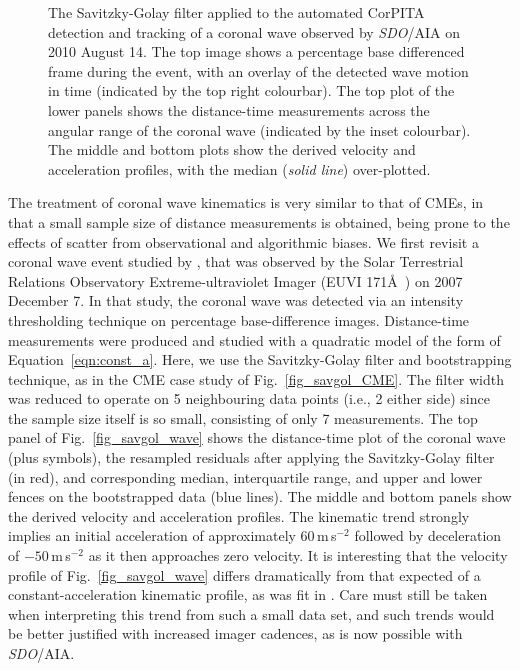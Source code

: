 \documentclass[structabstract]{aa}
\begin{document}
\begin{figure}[!t]
\caption{The Savitzky-Golay filter applied to the automated CorPITA detection and tracking of a coronal wave observed by \emph{SDO}/AIA on 2010 August 14. The top image shows a percentage base differenced frame during the event, with an overlay of the detected wave motion in time (indicated by the top right colourbar). The top plot of the lower panels shows the distance-time measurements across the angular range of the coronal wave (indicated by the inset colourbar). The middle and bottom plots show the derived velocity and acceleration profiles, with the median (\emph{solid line}) over-plotted.}
\label{fig_savgol_wave_CorPITA}
\end{figure}

The treatment of coronal wave kinematics is very similar to that of CMEs, in that a small sample size of distance measurements is obtained, being prone to the effects of scatter from observational and algorithmic biases. We first revisit a coronal wave event studied by \citet{2011A&A...531A..42L}, that was observed by the Solar Terrestrial Relations Observatory \citep[\emph{STEREO};][]{2008SSRv..136....5K} Extreme-ultraviolet Imager (EUVI 171\AA\ ) on 2007 December 7. In that study, the coronal wave was detected via an intensity thresholding technique on percentage base-difference images. Distance-time measurements were produced and studied with a quadratic model of the form of Equation~\ref{eqn:const_a}. Here, we use the Savitzky-Golay filter and bootstrapping technique, as in the CME case study of Fig.~\ref{fig_savgol_CME}. The filter width was reduced to operate on 5 neighbouring data points (i.e., 2 either side) since the sample size itself is so small, consisting of only 7 measurements. The top panel of Fig.~\ref{fig_savgol_wave} shows the distance-time plot of the coronal wave (plus symbols), the resampled residuals after applying the Savitzky-Golay filter (in red), and corresponding median, interquartile range, and upper and lower fences on the bootstrapped data (blue lines). The middle and bottom panels show the derived velocity and acceleration profiles. The kinematic trend strongly implies an initial acceleration of approximately 60\,m\,s$^{-2}$ followed by deceleration of $-50$\,m\,s$^{-2}$ as it then approaches zero velocity. It is interesting that the velocity profile of Fig.~\ref{fig_savgol_wave} differs dramatically from that expected of a constant-acceleration kinematic profile, as was fit in \citet{2011A&A...531A..42L}. Care must still be taken when interpreting this trend from such a small data set, and such trends would be better justified with increased imager cadences, as is now possible with \emph{SDO}/AIA.
\end{document}
